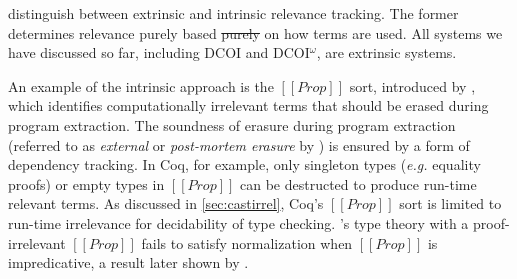 \documentclass[acmsmall, screen=true, nonacm=true,
  review=\ifpublic false\else true\fi,
  anonymous=\ifanonymous true\else false\fi
]{acmart}
\makeatletter
\newcommand{\dcoi}{DCOI\@\xspace}
\newcommand{\name}{\texorpdfstring{DCOI$^{\omega}$\@\xspace}{DCOI-omega}}
\newcommand{\eg}{\textit{e.g.}\@\xspace}
\providecommand{\DIFdel}[1]{{\protect\color{red}\sout{#1}}}                      %
\providecommand{\DIFdelbegin}{} %
\providecommand{\DIFdelend}{} %
\makeatother
\begin{document}

\citet{mishra:erasure} distinguish between extrinsic and intrinsic
relevance tracking. The former determines relevance purely based \DIFdelbegin \DIFdel{purely }\DIFdelend on
how terms are used. All systems we have discussed so
far, including \dcoi and \name, are extrinsic systems.

An example of the intrinsic approach is
the $[[Prop]]$ sort, introduced by \citet{paulin-mohring:coc},
which identifies computationally irrelevant terms that
should be erased during program extraction.
The soundness of erasure during program extraction (referred to as
\emph{external} or \emph{post-mortem erasure} by
\citet{abel:irrelevance}) is ensured by a form of dependency
tracking. In Coq, for example,
only singleton types (\eg equality proofs) or empty
types in $[[Prop]]$ can be destructed to produce run-time
relevant terms.
As discussed in \cref{sec:castirrel},
Coq's $[[Prop]]$ sort is limited to run-time irrelevance for
decidability of type checking. \citet{werner:proofirrel}'s type theory with
a proof-irrelevant $[[Prop]]$ fails to satisfy normalization when
$[[Prop]]$ is impredicative, a result later shown by \citet{abel:failurenorm}.

\end{document}
